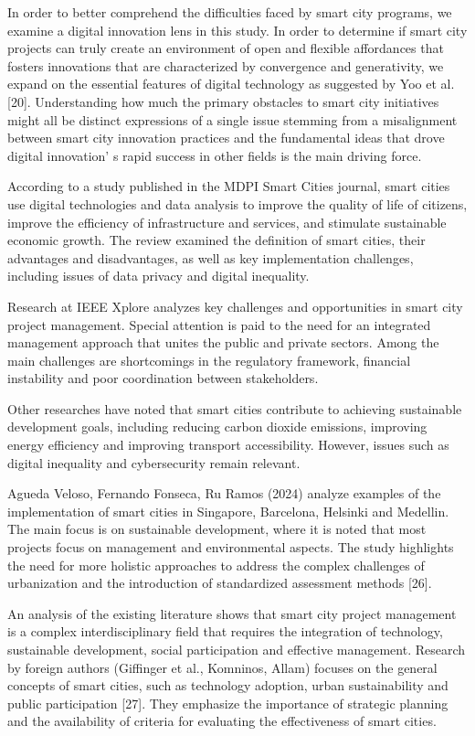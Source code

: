 {In order to better comprehend the difficulties faced by smart city
programs, we examine a digital innovation lens in this study. In order
to determine if smart city projects can truly create an environment of
open and flexible affordances that fosters innovations that are
characterized by convergence and generativity, we expand on the
essential features of digital technology as suggested by Yoo et al.
{[}20{]}. Understanding how much the primary obstacles to smart city
initiatives might all be distinct expressions of a single issue stemming
from a misalignment between smart city innovation practices and the
fundamental ideas that drove digital innovation' s rapid
success in other fields is the main driving force.

According to a study published in the MDPI Smart Cities journal, smart
cities use digital technologies and data analysis to improve the quality
of life of citizens, improve the efficiency of infrastructure and
services, and stimulate sustainable economic growth. The review examined
the definition of smart cities, their advantages and disadvantages, as
well as key implementation challenges, including issues of data privacy
and digital inequality.

Research at IEEE Xplore analyzes key challenges and opportunities in
smart city project management. Special attention is paid to the need for
an integrated management approach that unites the public and private
sectors. Among the main challenges are shortcomings in the regulatory
framework, financial instability and poor coordination between
stakeholders.

Other researches have noted that smart cities contribute to achieving
sustainable development goals, including reducing carbon dioxide
emissions, improving energy efficiency and improving transport
accessibility. However, issues such as digital inequality and
cybersecurity remain relevant.

Agueda Veloso, Fernando Fonseca, Ru Ramos (2024) analyze examples of the
implementation of smart cities in Singapore, Barcelona, Helsinki and
Medellin. The main focus is on sustainable development, where it is
noted that most projects focus on management and environmental aspects.
The study highlights the need for more holistic approaches to address
the complex challenges of urbanization and the introduction of
standardized assessment methods {[}26{]}.

An analysis of the existing literature shows that smart city project
management is a complex interdisciplinary field that requires the
integration of technology, sustainable development, social participation
and effective management. Research by foreign authors (Giffinger et al.,
Komninos, Allam) focuses on the general concepts of smart cities, such
as technology adoption, urban sustainability and public participation
{[}27{]}. They emphasize the importance of strategic planning and the
availability of criteria for evaluating the effectiveness of smart
cities.

}

